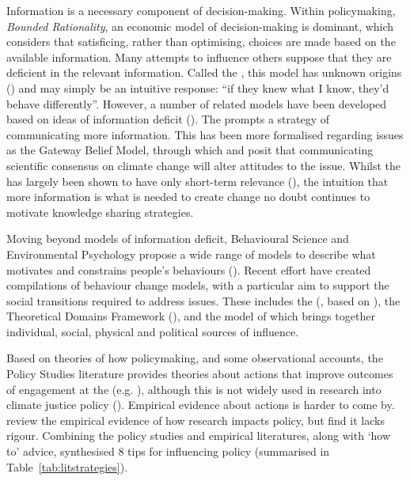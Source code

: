 Information is a necessary component of decision-making. Within policymaking, \emph{Bounded Rationality}, an economic model of decision-making is dominant, which considers that satisficing, rather than optimising, choices are made based on the available information. Many attempts to influence others suppose that they are deficient in the relevant information. Called the \IDM{}, this model has unknown origins (\cite{Nerlich2017}) and may simply be an intuitive response: ``if they knew what I know, they'd behave differently''. However, a number of related models have been developed based on ideas of information deficit (\cite{Darnton2008}). The \IDM{} prompts a strategy of communicating more information. This has been more formalised regarding \CAN{} issues as the Gateway Belief Model, through which \textcite{vanderLindenLFM2015} and \textcite{vanderLinden2021} posit that communicating scientific consensus on climate change will alter attitudes to the issue. Whilst the \IDM{} has largely been shown to have only short-term relevance (\cite[p24-5]{BA2024trust}), the intuition that more information is what is needed to create change no doubt continues to motivate knowledge sharing strategies.

Moving beyond models of information deficit, Behavioural Science and Environmental Psychology propose a wide range of models to describe what motivates and constrains people's behaviours (\cite{Darnton2008}). Recent effort have created compilations of behaviour change models, with a particular aim to support the social transitions required to address \CAN{} issues. These includes the \ISM{} (\cite{DarntonH2013}, based on \cite{SouthertonME2011}), the Theoretical Domains Framework (\cite{AtkinsFIOPIFDCGLM2017}), and the model of \textcite{HamptonW2023} which brings together individual, social, physical and political sources of influence.

Based on theories of how policymaking, and some observational accounts, the Policy Studies literature provides theories about actions that improve outcomes of engagement at the \SPI{} (e.g. \cite{RykielEtAl2002,McNie2007,Gluckman2014,BlessenohlS2022}), although this is not widely used in research into climate justice policy (\cite{CairneyTS2023}). Empirical evidence about actions is harder to come by. \textcite{OliverHBGC2022} review the empirical evidence of how research impacts policy, but find it lacks rigour. Combining the policy studies and empirical literatures, along with `how to' advice, \textcite{OliverC2019} synthesised 8 tips for influencing policy (summarised in Table~\ref{tab:litstrategies}).

